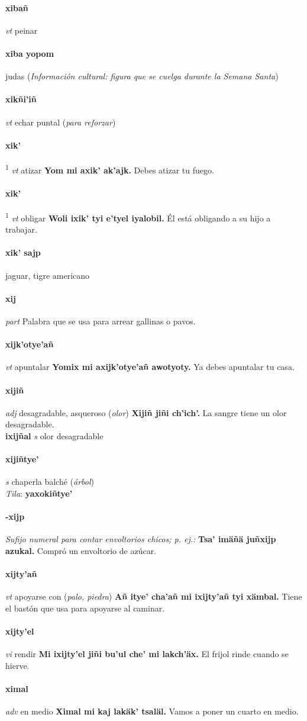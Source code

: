 \documentclass{scrbook}
\newcommand{\entry}[1]{\paragraph{#1}}
\newcommand{\defsuperscript}[1]{\textsuperscript{1}}
\newcommand{\nontranslationdef}[1]{\textit{#1}}
\newcommand{\partofspeech}[1]{\textit{#1}}
\newcommand{\spanishtranslation}[1]{#1}
\newcommand{\clarification}[1]{(\textit{#1})}
\newcommand{\cholexample}[1]{\textbf{#1}}
\newcommand{\exampletranslation}[1]{#1}
\newcommand{\dialectvariant}[1]{\\\textit{#1}:}
\newcommand{\dialectword}[1]{\textbf{#1}}
\newcommand{\culturalinformation}[1]{(\textit{#1})}
\newcommand{\secondaryentry}[1]{\\\textbf{#1}}
\newcommand{\secondpartofspeech}[1]{\textit{#1}}
\newcommand{\secondtranslation}[1]{#1}
\begin{document}
\begin{multicols}{2}
\entry{xibañ}
\partofspeech{vt}
\spanishtranslation{peinar}

\entry{xiba yopom}
\spanishtranslation{judas}
\culturalinformation{Información cultural: figura que se cuelga durante la Semana Santa}

\entry{xikñi'iñ}
\partofspeech{vt}
\spanishtranslation{echar puntal}
\clarification{para reforzar}

\entry{xik'}
\defsuperscript{1}
\partofspeech{vt}
\spanishtranslation{atizar}
\cholexample{Yom mi axik' ak'ajk.}
\exampletranslation{Debes atizar tu fuego.}

\entry{xik'}
\defsuperscript{2}
\partofspeech{vt}
\spanishtranslation{obligar}
\cholexample{Woli ixik' tyi e'tyel iyalobil.}
\exampletranslation{Él está obligando a su hijo a trabajar.}

\entry{xik' sajp}
\spanishtranslation{jaguar, tigre americano}

\entry{xij}
\partofspeech{part}
\spanishtranslation{Palabra que se usa para arrear gallinas o pavos.}

\entry{xijk'otye'añ}
\partofspeech{vt}
\spanishtranslation{apuntalar}
\cholexample{Yomix mi axijk'otye'añ awotyoty.}
\exampletranslation{Ya debes apuntalar tu casa.}

\entry{xijiñ}
\partofspeech{adj}
\spanishtranslation{desagradable, asqueroso}
\clarification{olor}
\cholexample{Xijiñ jiñi ch'ich'.}
\exampletranslation{La sangre tiene un olor desagradable.}
\secondaryentry{ixijñal}
\secondpartofspeech{s}
\secondtranslation{olor desagradable}

\entry{xijiñtye'}
\partofspeech{s}
\spanishtranslation{chaperla}
\spanishtranslation{balché}
\clarification{árbol}
\dialectvariant{Tila}
\dialectword{yaxokiñtye'}

\entry{-xijp}
\nontranslationdef{Sufijo numeral para contar envoltorios chicos; p. ej.:}
\cholexample{Tsa' imäñä juñxijp azukal.}
\exampletranslation{Compró un envoltorio de azúcar.}

\entry{xijty'añ}
\partofspeech{vt}
\spanishtranslation{apoyarse con}
\clarification{palo, piedra}
\cholexample{Añ itye' cha'añ mi ixijty'añ tyi xämbal.}
\exampletranslation{Tiene el bastón que usa para apoyarse al caminar.}

\entry{xijty'el}
\partofspeech{vi}
\spanishtranslation{rendir}
\cholexample{Mi ixijty'el jiñi bu'ul che' mi lakch'äx.}
\exampletranslation{El frijol rinde cuando se hierve.}

\entry{ximal}
\partofspeech{adv}
\spanishtranslation{en medio}
\cholexample{Ximal mi kaj lakäk' tsaläl.}
\exampletranslation{Vamos a poner un cuarto en medio.}


\end{multicols}
\end{document}
